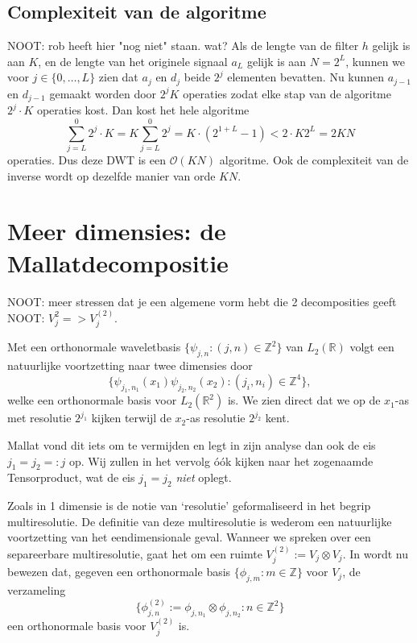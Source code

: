 \documentclass[11pt]{report}
\newcommand{\R}{\mathbb{R}}
\newcommand{\Z}{\mathbb{Z}}
\theoremstyle{plain}
\theoremstyle{remark}
\begin{document}
\subsection{Complexiteit van de algoritme}
NOOT: rob heeft hier "nog niet" staan. wat?
Als de lengte van de filter $h$ gelijk is aan $K$, en de lengte van het originele signaal $a_L$ gelijk is aan $N = 2^{L}$, kunnen we voor $j \in \{0, \ldots, L\}$ zien dat $a_j$ en $d_j$ beide $2^{j}$ elementen bevatten. Nu kunnen $a_{j-1}$ en $d_{j-1}$ gemaakt worden door $2^{j}K$ operaties zodat elke stap van de algoritme $2^{j} \cdot K$ operaties kost. Dan kost het hele algoritme
\[
	\sum_{j=L}^0 2^{j} \cdot K = K \sum_{j=L}^0 2^{j} = K \cdot (2^{1+L} - 1) < 2 \cdot K 2^{L} = 2KN
\]
operaties. Dus deze DWT is een $\mathcal{O}(KN)$ algoritme. Ook de complexiteit van de inverse wordt op dezelfde manier van orde $KN$. 

\section{Meer dimensies: de Mallatdecompositie}
NOOT: meer stressen dat je een algemene vorm hebt die 2 decomposities geeft
NOOT: $V^2_j => V^{(2)}_j$.

Met een orthonormale waveletbasis $\{ \psi_{j,n}: (j,n) \in \Z^2\}$ van $L_2(\R)$ volgt een natuurlijke voortzetting naar twee dimensies door
\[
  \{ \psi_{j_1,n_1}(x_1) \psi_{j_2,n_2}(x_2): (j_i,n_i) \in \Z^4 \},
\]
welke een orthonormale basis voor $L_2(\R^2)$ is. We zien direct dat we op de $x_1$-as met resolutie $2^{j_1}$ kijken terwijl de $x_2$-as resolutie $2^{j_2}$ kent. 

Mallat vond dit iets om te vermijden \cite[\S 7.7]{mallat} en legt in zijn analyse dan ook de eis $j_1 = j_2 =: j$ op. Wij zullen in het vervolg \'o\'ok kijken naar het zogenaamde Tensorproduct, wat de eis $j_1 = j_2$ \emph{niet} oplegt.

Zoals in 1 dimensie is de notie van `resolutie' geformaliseerd in het begrip multiresolutie. De definitie van deze multiresolutie is wederom een natuurlijke voortzetting van het eendimensionale geval. Wanneer we spreken over een separeerbare multiresolutie, gaat het om een ruimte $V_j^{(2)} := V_j \otimes V_j$. In \cite[A.5]{mallat} wordt nu bewezen dat, gegeven een orthonormale basis $\{ \phi_{j,m}: m \in \Z \}$ voor $V_j$, de verzameling
\begin{equation}
\label{phi_phi_basis}
	\{ \phi^{(2)}_{j,n} := \phi_{j,n_1} \otimes \phi_{j,n_2}: n \in \Z^2 \}
\end{equation}
een orthonormale basis voor $V_j^{(2)}$ is.
\end{document}
